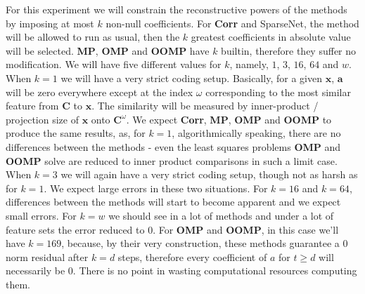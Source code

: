 \documentclass[12pt,a4paper,oneside,english]{UPBThesis}
\begin{document}
For this experiment we will constrain the reconstructive powers of the methods by imposing at most $k$ non-null coefficients. For \textbf{Corr} and SparseNet, the method will be allowed to run as usual, then the $k$ greatest coefficients in absolute value will be selected. \textbf{MP}, \textbf{OMP} and \textbf{OOMP} have $k$ builtin, therefore they suffer no modification. We will have five different values for $k$, namely, $1$, $3$, $16$, $64$ and $w$. When $k=1$ we will have a very strict coding setup. Basically, for a given $\textbf{x}$, $\textbf{a}$ will be zero everywhere except at the index $\omega$ corresponding to the most similar feature from $\textbf{C}$ to $\textbf{x}$. The similarity will be measured by inner-product / projection size of $\textbf{x}$ onto $\textbf{C}^\omega$. We expect \textbf{Corr}, \textbf{MP}, \textbf{OMP} and \textbf{OOMP} to produce the same results, as, for $k=1$, algorithmically speaking, there are no differences between the methods - even the least squares problems \textbf{OMP} and \textbf{OOMP} solve are reduced to inner product comparisons in such a limit case. When $k=3$ we will again have a very strict coding setup, though not as harsh as for $k=1$. We expect large errors in these two situations. For $k=16$ and $k=64$, differences between the methods will start to become apparent and we expect small errors. For $k=w$ we should see in a lot of methods and under a lot of feature sets the error reduced to $0$. For \textbf{OMP} and \textbf{OOMP}, in this case we'll have $k=169$, because, by their very construction, these methods guarantee a $0$ norm residual after $k=d$ steps, therefore every coefficient of $a$ for $t \ge d$ will necessarily be $0$. There is no point in wasting computational resources computing them.
\end{document}
